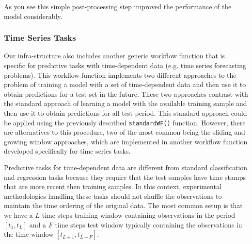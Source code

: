 \documentclass[10pt,a4paper]{article}\usepackage[]{graphicx}\usepackage[]{color}
\begin{document}
As you see this simple post-processing step improved the performance of the model considerably.


\subsubsection{Time Series Tasks}\label{sec:timeseriesWF}

Our infra-structure also includes another generic workflow function
that is specific for predictive tasks with time-dependent data
(e.g. time series forecasting problems). This workflow function
implements two different approaches to the problem of training a
 model with a set of time-dependent data and then use it to
obtain predictions for a test set in the future. These two approaches
contrast with the standard approach of learning a model with the
available training sample and then use it to obtain predictions for
all test period. This standard approach could be applied using the previously
described \texttt{standardWF()} function. However, there are
alternatives to this procedure, two of the most common being the
sliding and growing window approaches, which are implemented in another workflow function developed specifically for time series tasks.

Predictive tasks for time-dependent data are different from standard
classification and regression tasks because they require that the test
samples have time stamps that are more recent then training
samples. In this context, experimental methodologies handling these
tasks should not shuffle the observations to maintain the time ordering
of the original data. The most common setup is that we have a $L$  time steps
training window containing observations in the period $[t_1,t_L]$ and a $F$
time steps test window typically containing the observations in the
time window $[t_{L+1},t_{L+F}]$. 
\end{document}
